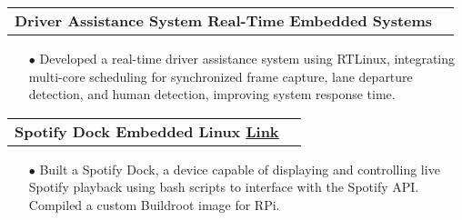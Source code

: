 \documentclass[11pt]{article}
\makeatletter
\newcommand{\resumeSubheadingP}[2]{
  \vspace{-2pt}\item
    \begin{tabular*}{1.0\textwidth}[t]{l@{\extracolsep{\fill}}r}
       \textbf{{\large #1}}&{#2} \\
    \end{tabular*}\vspace{-1pt}
}
\makeatother
\begin{document}
\resumeSubheadingP
{Driver Assistance System \textbar{ } Real-Time Embedded Systems }{}
\begin{itemize}[leftmargin=0.3in]\setlength{\itemsep}{0pt}\setlength{\parskip}{0pt}\vspace{-0.2cm}
  \item[$\bullet$] Developed a real-time driver assistance system using RTLinux, integrating multi-core scheduling for synchronized frame capture, lane departure detection, and human detection, improving system response time.
\end{itemize}
\vspace{-0.2cm}


\resumeSubheadingP
{Spotify Dock \textbar{ } Embedded Linux \href{https://github.com/cu-ecen-aeld/final-project-parthkharade/wiki/Project-Overview}{\small{\textbar{ }\underline{Link} }}}{}
\begin{itemize}[leftmargin=0.3in]\setlength{\itemsep}{0pt}\setlength{\parskip}{0pt}\vspace{-0.2cm}
  \item[$\bullet$] Built a Spotify Dock, a device capable of displaying and controlling live Spotify playback
    using bash scripts to interface with the Spotify API. Compiled a custom Buildroot image for RPi.
\end{itemize}
\vspace{-0.2cm}
\end{document}
